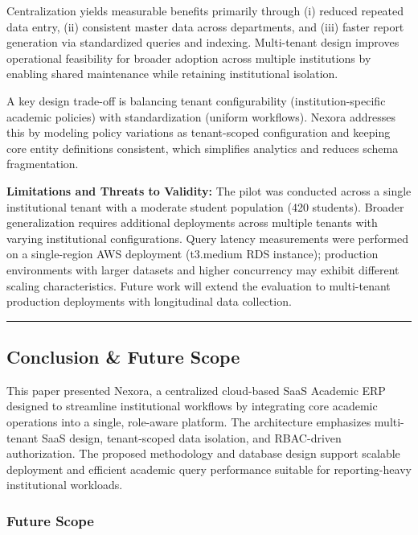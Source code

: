 \documentclass[11pt]{article}
\begin{document}
Centralization yields measurable benefits primarily through (i) reduced
repeated data entry, (ii) consistent master data across departments, and
(iii) faster report generation via standardized queries and indexing.
Multi-tenant design improves operational feasibility for broader
adoption across multiple institutions by enabling shared maintenance
while retaining institutional isolation.

A key design trade-off is balancing tenant configurability
(institution-specific academic policies) with standardization (uniform
workflows). Nexora addresses this by modeling policy variations as
tenant-scoped configuration and keeping core entity definitions
consistent, which simplifies analytics and reduces schema fragmentation.

\textbf{Limitations and Threats to Validity:} The pilot was conducted
across a single institutional tenant with a moderate student population
(420 students). Broader generalization requires additional deployments
across multiple tenants with varying institutional configurations. Query
latency measurements were performed on a single-region AWS deployment
(t3.medium RDS instance); production environments with larger datasets
and higher concurrency may exhibit different scaling characteristics.
Future work will extend the evaluation to multi-tenant production
deployments with longitudinal data collection.

\begin{center}\rule{0.5\linewidth}{0.5pt}\end{center}

\subsection{Conclusion \& Future Scope}\label{conclusion-future-scope}

This paper presented Nexora, a centralized cloud-based SaaS Academic ERP
designed to streamline institutional workflows by integrating core
academic operations into a single, role-aware platform. The architecture
emphasizes multi-tenant SaaS design, tenant-scoped data isolation, and
RBAC-driven authorization. The proposed methodology and database design
support scalable deployment and efficient academic query performance
suitable for reporting-heavy institutional workloads.

\subsubsection{Future Scope}\label{future-scope}
\end{document}
